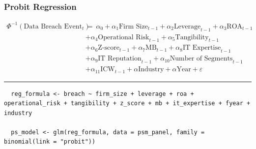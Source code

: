 \documentclass[13pt]{beamer}
\begin{document}
\begin{frame}[fragile] %
  \frametitle{Probit Regression}

  \begin{scriptsize}

    \begin{align*}
      \Phi^{-1}(\text{Data Breach Event}_{t}) & =\ \alpha_0 + \alpha_1\text{Firm Size}_{t-1} + \alpha_2\text{Leverage}_{t-1} + \alpha_3\text{ROA}_{t-1} \\
                                              & + \alpha_4\text{Operational Risk}_{t-1} + \alpha_5\text{Tangibility}_{t-1}                              \\
                                              & + \alpha_6\text{Z-score}_{t-1} + \alpha_7\text{MB}_{t-1} + \alpha_8\text{IT Expertise}_{t-1}            \\
                                              & + \alpha_9\text{IT Reputation}_{t-1} + \alpha_{10}\text{Number of Segments}_{t-1}                       \\
                                              & + \alpha_{11}\text{ICW}_{t-1} + \alpha \text{Industry} + \alpha\text{Year} + \varepsilon
    \end{align*}

  \end{scriptsize}

  \rule{\textwidth}{1pt}

  \begin{lstlisting}
  reg_formula <- breach ~ firm_size + leverage + roa + operational_risk + tangibility + z_score + mb + it_expertise + fyear + industry

  ps_model <- glm(reg_formula, data = psm_panel, family = binomial(link = "probit"))
  \end{lstlisting}

\end{frame}
\end{document}
